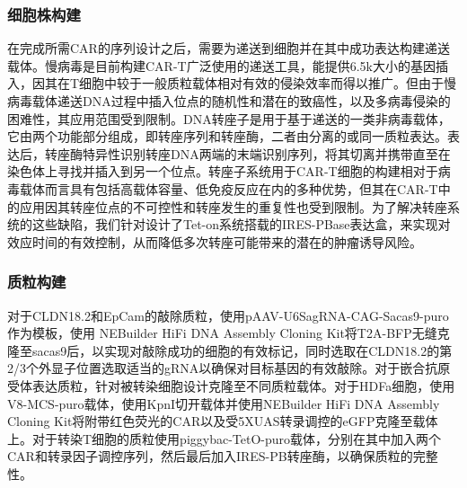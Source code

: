 \documentclass[12pt]{article}
\begin{document}
\subsubsection{细胞株构建}

在完成所需CAR的序列设计之后，需要为递送到细胞并在其中成功表达构建递送载体。慢病毒是目前构建CAR-T广泛使用的递送工具，能提供6.5k大小的基因插入，因其在T细胞中较于一般质粒载体相对有效的侵染效率而得以推广。但由于慢病毒载体递送DNA过程中插入位点的随机性和潜在的致癌性，以及多病毒侵染的困难性，其应用范围受到限制。DNA转座子是用于基于递送的一类非病毒载体，它由两个功能部分组成，即转座序列和转座酶，二者由分离的或同一质粒表达。表达后，转座酶特异性识别转座DNA两端的末端识别序列，将其切离并携带直至在染色体上寻找并插入到另一个位点。转座子系统用于CAR-T细胞的构建相对于病毒载体而言具有包括高载体容量、低免疫反应在内的多种优势，但其在CAR-T中的应用因其转座位点的不可控性和转座发生的重复性也受到限制。为了解决转座系统的这些缺陷，我们针对设计了Tet-on系统搭载的IRES-PBase表达盒，来实现对效应时间的有效控制，从而降低多次转座可能带来的潜在的肿瘤诱导风险。

\subsubsection{质粒构建}
对于CLDN18.2和EpCam的敲除质粒，使用pAAV-U6SagRNA-CAG-Sacas9-puro作为模板，使用 NEBuilder HiFi DNA Assembly Cloning Kit将T2A-BFP无缝克隆至sacas9后，以实现对敲除成功的细胞的有效标记，同时选取在CLDN18.2的第2/3个外显子位置选取适当的gRNA以确保对目标基因的有效敲除。对于嵌合抗原受体表达质粒，针对被转染细胞设计克隆至不同质粒载体。对于HDFa细胞，使用V8-MCS-puro载体，使用KpnI切开载体并使用NEBuilder HiFi DNA Assembly Cloning Kit将附带红色荧光的CAR以及受5XUAS转录调控的eGFP克隆至载体上。对于转染T细胞的质粒使用piggybac-TetO-puro载体，分别在其中加入两个CAR和转录因子调控序列，然后最后加入IRES-PB转座酶，以确保质粒的完整性。
\end{document}
